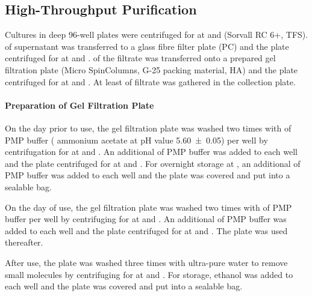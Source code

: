 \subsection{High-Throughput \EPS{} Purification\label{hteps-purification}}
Cultures in deep 96-well plates were centrifuged for  at  and  (Sorvall RC 6+, TFS).  of supernatant was transferred to a  glass fibre filter plate (PC) and the plate centrifuged for  at  and .  of the filtrate was transferred onto a prepared gel filtration plate (Micro SpinColumns, G-25 packing material, HA) and the plate centrifuged for  at  and . At least  of filtrate was gathered in the collection plate.%

\paragraph{Preparation of Gel Filtration Plate}
On the day prior to use, the gel filtration plate was washed two times with  of PMP buffer ( ammonium acetate at pH value \num{5.60(5)}) per well by centrifugation for  at  and . An additional  of PMP buffer was added to each well and the plate centrifuged for  at  and . For overnight storage at , an additional  of PMP buffer was added to each well and the plate was covered and put into a sealable bag.

On the day of use, the gel filtration plate was washed two times with  of PMP buffer per well by centrifuging for  at  and . An additional  of PMP buffer was added to each well and the plate centrifuged for  at  and . The plate was used thereafter.

After use, the plate was washed three times with  ultra-pure water to remove small molecules by centrifuging for  at  and . For storage,   ethanol was added to each well and the plate was covered and put into a sealable bag.

